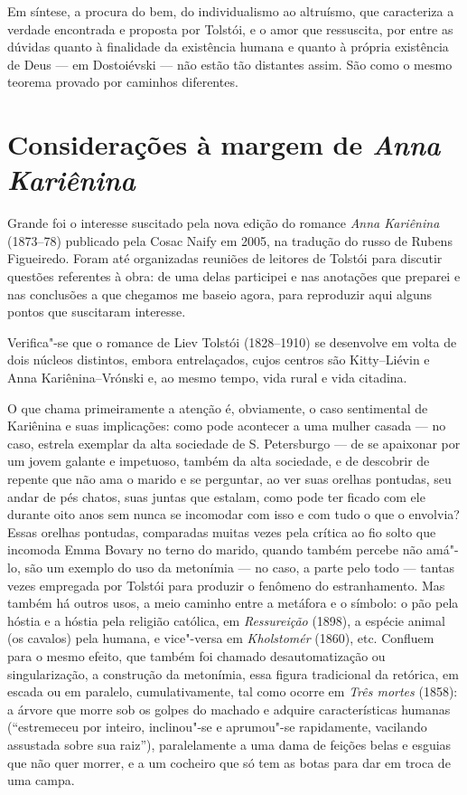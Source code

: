 Em síntese, a procura do bem, do individualismo ao altruísmo, que
caracteriza a verdade encontrada e proposta por Tolstói, e o amor que
ressuscita, por entre as dúvidas quanto à finalidade da existência
humana e quanto à própria existência de Deus --- em Dostoiévski --- não estão
tão distantes assim. São como o mesmo teorema provado por caminhos
diferentes.

\chapter{Considerações à margem de \emph{Anna Kariênina}}

Grande foi o interesse suscitado pela nova edição do romance \emph{Anna
Kariênina} (1873--78) publicado pela Cosac Naify em 2005, na tradução do russo de Rubens Figueiredo. Foram até organizadas
reuniões de leitores de Tolstói para discutir questões referentes à
obra: de uma delas participei e nas anotações que preparei e nas
conclusões a que chegamos me baseio agora, para reproduzir aqui alguns
pontos que suscitaram interesse.

Verifica"-se que o romance de Liev Tolstói (1828--1910) se desenvolve em
volta de dois núcleos distintos, embora entrelaçados, cujos centros
são Kitty--Liévin e Anna Kariênina--Vrónski e, ao mesmo tempo, vida
rural e vida citadina.

O que chama primeiramente a atenção é, obviamente, o caso sentimental de
Kariênina e suas implicações: como pode acontecer a uma mulher
casada --- no caso, estrela exemplar da alta sociedade de S.
Petersburgo --- de se apaixonar por um jovem galante e impetuoso, também
da alta sociedade, e de descobrir de repente que não ama o marido e se
perguntar, ao ver suas orelhas pontudas, seu andar de pés chatos, suas
juntas que estalam, como pode ter ficado com ele durante oito anos sem
nunca se incomodar com isso e com tudo o que o envolvia? Essas orelhas
pontudas, comparadas muitas vezes pela crítica ao fio solto que incomoda
Emma Bovary no terno do marido, quando também percebe não amá"-lo, são um
exemplo do uso da metonímia --- no caso, a parte pelo todo --- tantas
vezes empregada por Tolstói para produzir o fenômeno do estranhamento.
Mas também há outros usos, a meio caminho entre a metáfora e o símbolo:
o pão pela hóstia e a hóstia pela religião católica,
em \emph{Ressureição} (1898), a espécie animal (os cavalos) pela
humana, e vice"-versa em \emph{Kholstomér} (1860), etc. Confluem para o
mesmo efeito, que também foi chamado desautomatização ou
singularização, a construção da metonímia, essa figura tradicional da
retórica, em escada ou em paralelo, cumulativamente, tal como
ocorre em \emph{Três mortes} (1858): a árvore que morre sob os golpes
do machado e adquire características humanas (``estremeceu por
inteiro, inclinou"-se e aprumou"-se rapidamente, vacilando assustada sobre
sua raiz''), paralelamente a uma dama de feições belas e esguias que
não quer morrer, e a um cocheiro que só tem as botas para dar em troca
de uma campa.

